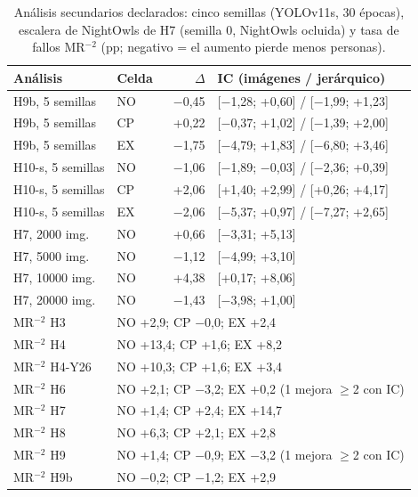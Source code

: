 \begin{table}[H]\centering\scriptsize
\caption{Análisis secundarios declarados: cinco semillas (YOLOv11s, 30 épocas), escalera de NightOwls de H7 (semilla 0, NightOwls ocluida) y tasa de fallos MR$^{-2}$ (pp; negativo = el aumento pierde menos personas).}\label{tab:s-extra}
\setlength{\tabcolsep}{2.5pt}\begin{tabular}{@{}l l r l@{}}\toprule
Análisis & Celda & $\Delta$ & IC (imágenes / jerárquico) \\
\midrule
H9b, 5 semillas & NO & $-$0{,}45 & [$-$1{,}28; +0{,}60] / [$-$1{,}99; +1{,}23] \\
H9b, 5 semillas & CP & +0{,}22 & [$-$0{,}37; +1{,}02] / [$-$1{,}39; +2{,}00] \\
H9b, 5 semillas & EX & $-$1{,}75 & [$-$4{,}79; +1{,}83] / [$-$6{,}80; +3{,}46] \\
H10-s, 5 semillas & NO & $-$1{,}06 & [$-$1{,}89; $-$0{,}03] / [$-$2{,}36; +0{,}39] \\
H10-s, 5 semillas & CP & +2{,}06 & [+1{,}40; +2{,}99] / [+0{,}26; +4{,}17] \\
H10-s, 5 semillas & EX & $-$2{,}06 & [$-$5{,}37; +0{,}97] / [$-$7{,}27; +2{,}65] \\
\midrule
H7, 2000 img. & NO & +0{,}66 & [$-$3{,}31; +5{,}13] \\
H7, 5000 img. & NO & $-$1{,}12 & [$-$4{,}99; +3{,}10] \\
H7, 10000 img. & NO & +4{,}38 & [+0{,}17; +8{,}06] \\
H7, 20000 img. & NO & $-$1{,}43 & [$-$3{,}98; +1{,}00] \\
\midrule
MR$^{-2}$ H3 & \multicolumn{3}{l}{NO +2{,}9; CP $-$0{,}0; EX +2{,}4} \\
MR$^{-2}$ H4 & \multicolumn{3}{l}{NO +13{,}4; CP +1{,}6; EX +8{,}2} \\
MR$^{-2}$ H4-Y26 & \multicolumn{3}{l}{NO +10{,}3; CP +1{,}6; EX +3{,}4} \\
MR$^{-2}$ H6 & \multicolumn{3}{l}{NO +2{,}1; CP $-$3{,}2; EX +0{,}2 (1 mejora $\geq$2 con IC)} \\
MR$^{-2}$ H7 & \multicolumn{3}{l}{NO +1{,}4; CP +2{,}4; EX +14{,}7} \\
MR$^{-2}$ H8 & \multicolumn{3}{l}{NO +6{,}3; CP +2{,}1; EX +2{,}8} \\
MR$^{-2}$ H9 & \multicolumn{3}{l}{NO +1{,}4; CP $-$0{,}9; EX $-$3{,}2 (1 mejora $\geq$2 con IC)} \\
MR$^{-2}$ H9b & \multicolumn{3}{l}{NO $-$0{,}2; CP $-$1{,}2; EX +2{,}9} \\

\end{tabular}
\end{table}
